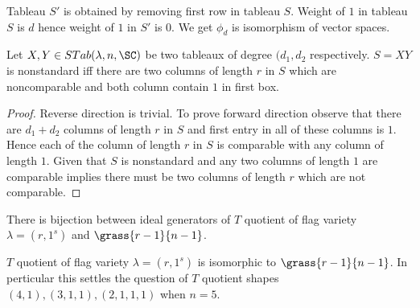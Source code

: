 Tableau \(S'\) is obtained by removing first row in tableau \(S\). Weight of \(1\) in tableau \(S\) is \(d\) hence weight of \(1\) in \(S'\) is \(0\). We get \(\phi_d\) is isomorphism of vector spaces. 
\begin{observation}
    Let \(X,Y \in STab(\lambda,n,\SC)\) be two tableaux of degree \((d_1,d_2\) respectively.
    \(S=XY\) is nonstandard iff there are two columns of length \(r\) in \(S\) 
    which are noncomparable and both column contain \(1\) in first box.
\end{observation}
\begin{proof}
    Reverse direction is trivial. 
    To prove forward direction observe that there are \(d_1+d_2\) columns of length \(r\) in \(S\)
    and first entry in all of these columns is \(1\). 
    Hence each of the column of length \(r\) in \(S\) is comparable with any column of length \(1\). 
    Given that \(S\) is nonstandard and any two columns of length \(1\) are comparable 
    implies there must be two columns of length \(r\) which are not comparable.
\end{proof}

\begin{corollary}
    There is bijection between ideal generators of \(T\) quotient of flag variety \(\lambda=(r,1^s)\) and \(\grass{r-1}{n-1}\).
\end{corollary}
\begin{corollary}
    \(T\) quotient of flag variety \(\lambda=(r,1^s)\) is isomorphic to \(\grass{r-1}{n-1}\). In perticular this settles the question of \(T\) quotient shapes \((4,1), (3,1,1), (2,1,1,1)\) when \(n=5\).
\end{corollary}


%
